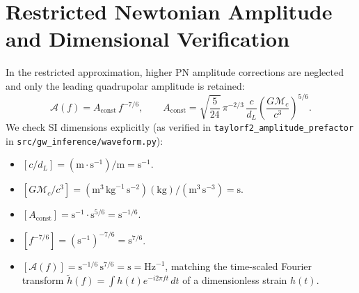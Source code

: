 \documentclass[11pt,a4paper]{report}
\begin{document}
\section{Restricted Newtonian Amplitude and Dimensional Verification}
In the restricted approximation, higher PN amplitude corrections are neglected and only the leading quadrupolar amplitude is retained:
\begin{equation}
\mathcal{A}(f) = A_{\mathrm{const}}\,f^{-7/6}, \qquad A_{\mathrm{const}} = \sqrt{\frac{5}{24}}\,\pi^{-2/3}\,\frac{c}{d_L}\left(\frac{G \mathcal{M}_c}{c^3}\right)^{5/6}.
\end{equation}
We check SI dimensions explicitly (as verified in \texttt{taylorf2\_amplitude\_prefactor} in \texttt{src/gw\_inference/waveform.py}):
\begin{itemize}[leftmargin=1.5em]
    \item $[c / d_L] = (\mathrm{m}\cdot\mathrm{s}^{-1}) / \mathrm{m} = \mathrm{s}^{-1}$.
    \item $[G \mathcal{M}_c / c^3] = (\mathrm{m}^3\,\mathrm{kg}^{-1}\,\mathrm{s}^{-2})(\mathrm{kg}) / (\mathrm{m}^3\,\mathrm{s}^{-3}) = \mathrm{s}$.
    \item $[A_{\mathrm{const}}] = \mathrm{s}^{-1} \cdot \mathrm{s}^{5/6} = \mathrm{s}^{-1/6}$.
    \item $[f^{-7/6}] = (\mathrm{s}^{-1})^{-7/6} = \mathrm{s}^{7/6}$.
    \item $[\mathcal{A}(f)] = \mathrm{s}^{-1/6}\,\mathrm{s}^{7/6} = \mathrm{s} = \mathrm{Hz}^{-1}$, matching the time-scaled Fourier transform $\tilde{h}(f) = \int h(t) e^{-i2\pi f t}\,dt$ of a dimensionless strain $h(t)$.
\end{itemize}
\end{document}
